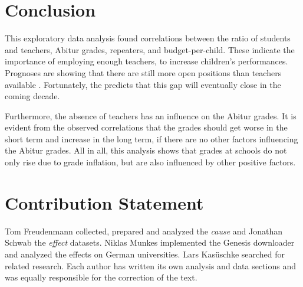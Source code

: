 \section{Conclusion}
This exploratory data analysis found correlations between the ratio of students and teachers, Abitur grades, repeaters, and budget-per-child. These indicate the importance of employing enough teachers, to increase children's performances. Prognoses are  showing that there are still more open positions than teachers available \cite{kultusminister_konferenz_lehrkrafteeinstellungsbedarf_2023}. Fortunately, the \citeauthor{kultusminister_konferenz_lehrkrafteeinstellungsbedarf_2023} predicts that this gap will eventually close in the coming decade.

Furthermore, the absence of teachers has an influence on the Abitur grades. It is evident from the observed correlations that the grades should get worse in the short term and increase in the long term, if there are no other factors influencing the Abitur grades. All in all, this analysis shows that grades at schools do not only rise due to grade inflation, but are also influenced by other positive factors.

\section*{Contribution Statement}
Tom Freudenmann collected, prepared and analyzed the \emph{cause} and Jonathan Schwab the \emph{effect} datasets. Niklas Munkes implemented the Genesis downloader and analyzed the effects on German universities. Lars Kasüschke searched for related research. Each author has written its own analysis and data sections and was equally responsible for the correction of the text.



